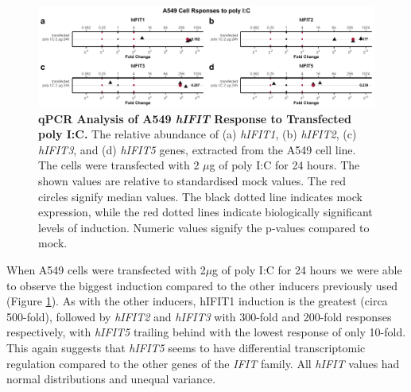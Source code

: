 \begin{figure}
    \centering
    \includegraphics[width=1\linewidth]{06. Chapter 1/Figs/01. Induction/04. a549_treat_polyic.pdf}
    \caption[qPCR Analysis of A549 \textit{hIFIT} Response to Transfected poly I:C.]{\textbf{qPCR Analysis of A549 \textit{hIFIT} Response to Transfected poly I:C.} The relative abundance of (a) \textit{hIFIT1}, (b) \textit{hIFIT2}, (c) \textit{hIFIT3}, and (d) \textit{hIFIT5} genes, extracted from the A549 cell line. The cells were transfected with 2 \(\mu\)g of poly I:C for 24 hours. The shown values are relative to standardised mock values. The red circles signify median values. The black dotted line indicates mock expression, while the red dotted lines indicate biologically significant levels of induction. Numeric values signify the p-values compared to mock.}
    \label{A549 Response to poly I:C}
\end{figure}

When A549 cells were transfected with 2\(\mu\)g of poly I:C for 24 hours we were able to observe the biggest induction compared to the other inducers previously used (Figure \ref{A549 Response to poly I:C}). As with the other inducers, hIFIT1 induction is the greatest (circa 500-fold), followed by \textit{hIFIT2} and \textit{hIFIT3} with 300-fold and 200-fold responses respectively, with \textit{hIFIT5} trailing behind with the lowest response of only 10-fold. This again suggests that \textit{hIFIT5} seems to have differential transcriptomic regulation compared to the other genes of the \textit{IFIT} family. All \textit{hIFIT} values had normal distributions and unequal variance.

